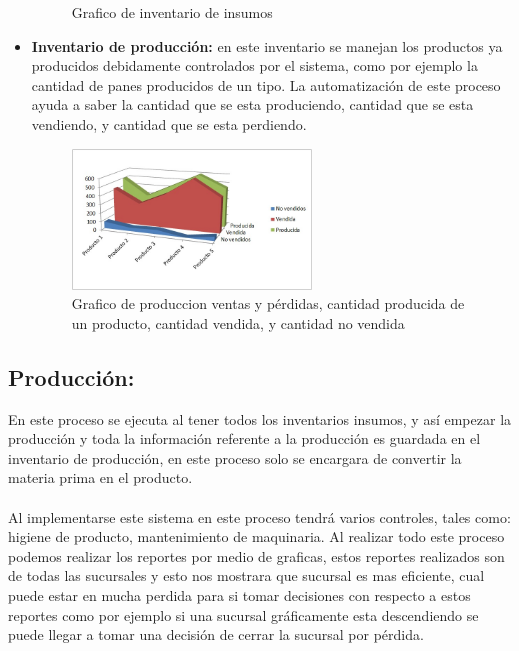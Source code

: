 \begin{itemize}
\begin{figure}[htbp]
	\caption{Grafico de inventario de insumos}
	\label{fig:Graficodeinventariodeinsumos}
\end{figure}%
%	
		\item \textbf{Inventario de producci\'on:} en  este inventario se manejan los productos ya producidos debidamente controlados por el sistema, como por ejemplo la cantidad de panes producidos de un tipo. La automatizaci\'on de este proceso ayuda a saber la cantidad que se esta produciendo, cantidad que se esta vendiendo, y cantidad que se esta perdiendo.
%
\begin{figure}[htbp]
	\centering
		\includegraphics[width=0.60\textwidth]{images/Producidavendidaperdida.jpg}
	\caption{Grafico de produccion ventas y p\'erdidas, cantidad producida de un producto, cantidad vendida, y cantidad no vendida}
	\label{fig:Graficodeproduccionventasyperdidas}
\end{figure}%
\end{itemize}
%
\subsection{Producci\'on:}En este proceso se ejecuta al tener todos los inventarios insumos, y as\'i empezar la producci\'on y toda la informaci\'on referente a la producci\'on es guardada en el inventario de producci\'on, en este proceso solo se encargara de convertir la materia prima en el producto.	%
\\%
\\%
Al implementarse este sistema en este proceso tendr\'a varios controles, tales como: higiene de producto, mantenimiento de maquinaria. Al realizar todo este proceso podemos realizar los reportes por medio de graficas, estos reportes realizados son de todas las sucursales y esto nos mostrara que sucursal es mas eficiente, cual puede estar en mucha perdida para si tomar decisiones con respecto a estos reportes como por ejemplo si una sucursal gr\'aficamente esta descendiendo se puede llegar a tomar una decisi\'on de cerrar la sucursal por p\'erdida.%
